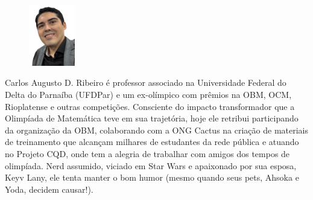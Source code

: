 \documentclass{hipatia}
\theoremstyle{definition} %
\begin{document}
%
%
%
\nocite{*}



\begin{figure}
	\centering
	\includegraphics[width=2cm]{Carlos.jpeg}
\end{figure}\noindent
Carlos Augusto D. Ribeiro é professor associado na Universidade Federal do Delta do Parnaíba (UFDPar) e um ex-olímpico com prêmios na OBM, OCM, Rioplatense e outras competições. Consciente do impacto transformador que a Olimpíada de Matemática teve em sua trajetória, hoje ele retribui participando da organização da OBM, colaborando com a ONG Cactus na criação de materiais de treinamento que alcançam milhares de estudantes da rede pública e atuando no Projeto CQD, onde tem a alegria de trabalhar com amigos dos tempos de olimpíada. Nerd assumido, viciado em Star Wars e apaixonado por sua esposa, Keyv Lany, ele tenta manter o bom humor (mesmo quando seus pets, Ahsoka e Yoda, decidem causar!).
\end{document}
